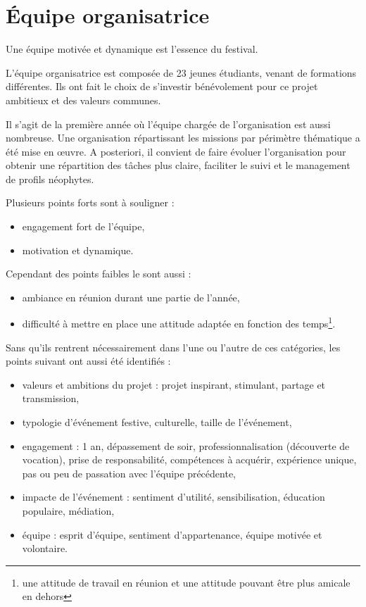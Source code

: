 \documentclass[12pt,a4paper]{report}
\begin{document}
\chapter{Équipe organisatrice}

Une équipe motivée et dynamique est l'essence du festival. 

L’équipe organisatrice est composée de 23 jeunes étudiants, venant de formations différentes. Ils ont fait le choix de s’investir bénévolement pour ce projet ambitieux et des valeurs communes.

Il s'agit de la première année où l'équipe chargée de l'organisation est aussi nombreuse. Une organisation répartissant les missions par périmètre thématique a été mise en œuvre. A posteriori, il convient de faire évoluer l'organisation pour obtenir une répartition des tâches plus claire, faciliter le suivi et le management de profils néophytes. 

Plusieurs points forts sont à souligner : 
\begin{itemize}
\item engagement fort de l'équipe,
\item motivation et dynamique.
\end{itemize}

Cependant des points faibles le sont aussi : 
\begin{itemize}
\item ambiance en réunion durant une partie de l'année,
\item difficulté à mettre en place une attitude adaptée en fonction des temps\footnote{une attitude de travail en réunion et une attitude pouvant être plus amicale en dehors}.
\end{itemize}

Sans qu'ils rentrent nécessairement dans l'une ou l'autre de ces catégories, les points suivant ont aussi été identifiés :
\begin{itemize}
\item valeurs et ambitions du projet : projet inspirant, stimulant, partage et transmission,
\item typologie d'événement festive, culturelle, taille de l'événement,
\item engagement : 1 an, dépassement de soir, professionnalisation (découverte de vocation), prise de responsabilité, compétences à acquérir, expérience unique, pas ou peu de passation avec l'équipe précédente,
\item impacte de l'événement : sentiment d'utilité, sensibilisation, éducation populaire, médiation,
\item équipe : esprit d'équipe, sentiment d'appartenance, équipe motivée et volontaire.
\end{itemize}
\end{document}
